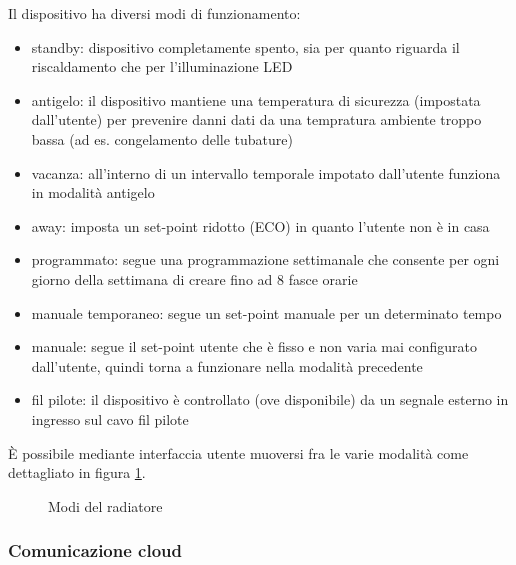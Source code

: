 \documentclass[a4paper,titlepage]{article}
\begin{document}
Il dispositivo ha diversi modi di funzionamento:
\begin{itemize}
    \item standby: dispositivo completamente spento, sia per quanto riguarda il riscaldamento
        che per l'illuminazione LED
    \item antigelo: il dispositivo mantiene una temperatura di sicurezza (impostata dall'utente)
        per prevenire danni dati da una tempratura ambiente troppo bassa (ad es. congelamento delle tubature)
    \item vacanza: all'interno di un intervallo temporale impotato dall'utente funziona
        in modalità antigelo
    \item away: imposta un set-point ridotto (ECO) in quanto l'utente non è in casa
    \item programmato: segue una programmazione settimanale che consente per ogni
        giorno della settimana di creare fino ad 8 fasce orarie
    \item manuale temporaneo: segue un set-point manuale per un determinato tempo
    \item manuale: segue il set-point utente che è fisso e non varia mai
        configurato dall'utente, quindi torna a funzionare nella modalità precedente
    \item fil pilote: il dispositivo è controllato (ove disponibile) da un segnale
        esterno in ingresso sul cavo fil pilote
\end{itemize}

È possibile mediante interfaccia utente muoversi fra le varie modalità come dettagliato
in figura \ref{modi}.

\begin{figure}[ht]
    \centering
    \caption{Modi del radiatore}
    \label{modi}
\end{figure}

\subsubsection{Comunicazione cloud}
\end{document}

